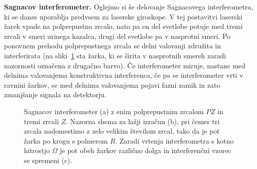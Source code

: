 \begin{example}{\bf Sagnacov interferometer.} Oglejmo si še delovanje
Sagnacovega interferometra, ki se danes uporablja predvsem za laserske 
giroskope. V tej postavitvi laserski žarek vpade na polprepustno zrcalo, nato pa 
en del svetlobe potuje med tremi zrcali v smeri urinega kazalca, drugi del 
svetlobe pa v nasprotni smeri. Po ponovnem prehodu polprepustnega zrcala se delni
valovanji združita in interferirata (na sliki~\ref{fig:06_Sagnac} sta 
žarka, ki se širita v nasprotnih smereh zaradi nazornosti označena z drugačno 
barvo). Če interferometer miruje, nastane med delnima valovanjema
konstruktivna interferenca, če pa se interferometer vrti v ravnini žarkov, se
med delnima valovanjema pojavi fazni zamik in zato zmanjšanje signala na detektorju.
\begin{figure}[ht]
\centering
\def\svgwidth{140truemm} 

\caption{Sagnacov interferometer (a) z enim polprepustnim zrcalom $PZ$ 
in tremi zrcali $Z$. Nazorna shema za 
lažji izračun (b), pri čemer tri zrcala nadomestimo z zelo velikim številom zrcal, 
tako da je pot žarka po krogu s polmerom $R$. Zaradi vrtenja interferometra 
s kotno hitrostjo $\Omega$ je pot obeh 
žarkov različno dolga in interferenčni vzorec se spremeni (c).
}
\label{fig:06_Sagnac}
\end{figure}


\end{example}
